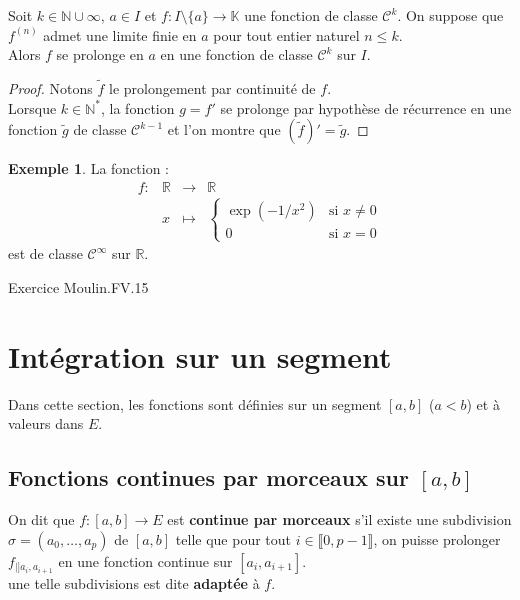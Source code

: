 \documentclass[french]{article}
\newcommand{\N}{\mathbb{N}}
\newcommand{\R}{\mathbb{R}}
\newcommand{\K}{\mathbb{K}}
\newcommand{\st}{^*}
\theoremstyle{plain}
\theoremstyle{definition}
\newtheorem*{ex}{Exemple}
\theoremstyle{remark}
\begin{document}
\begin{prop}[HP]%
	Soit $k\in\N\cup{\infty}$, $a\in I$ et $f:I\setminus\{a\}\to\K$ une fonction de classe $\mathcal{C}^k$. On suppose que $f^{(n)}$ admet une limite finie en $a$ pour tout entier naturel $n\leqslant k$. \\
	Alors $f$ se prolonge en $a$ en une fonction de classe $\mathcal{C}^k$ sur $I$.
\end{prop}
\begin{proof}
	Notons $\tilde{f}$ le prolongement par continuité de $f$.\\
	Lorsque $k\in\N\st$, la fonction $g=f'$ se prolonge par hypothèse de récurrence en une fonction $\tilde{g}$ de classe $\mathcal{C}^{k-1}$ et l'on montre que $(\tilde{f})'=\tilde{g}$.
\end{proof}

\begin{ex}
	La fonction :
	$$\begin{array}{lrcl}
		f:&\R&\longrightarrow&\R\\
		&x&\longmapsto&\displaystyle\begin{cases}
			\exp(-1/x^2)&\text{si }x\ne 0\\
			0&\text{si }x=0
		\end{cases}
	\end{array}$$ est de classe $\mathcal{C}^\infty$ sur $\R$.
\end{ex}

Exercice Moulin.FV.15

\section{Intégration sur un segment}

Dans cette section, les fonctions sont définies sur un segment $[a,b]$ ($a<b$) et à valeurs dans $E$.

\subsection{Fonctions continues par morceaux sur $[a,b]$}

\begin{dfn}
	On dit que $f:[a,b]\to E$ est \textbf{continue par morceaux} s'il existe une subdivision $\sigma=(a_0,\ldots,a_p)$ de $[a,b]$ telle que pour tout $i\in\llbracket0,p-1\rrbracket$, on puisse prolonger $f_{\mid]a_i,a_{i+1}}$ en une fonction continue sur $[a_i,a_{i+1}]$. \\
	une telle subdivisions est dite \textbf{adaptée} à $f$.
\end{dfn}
\end{document}
